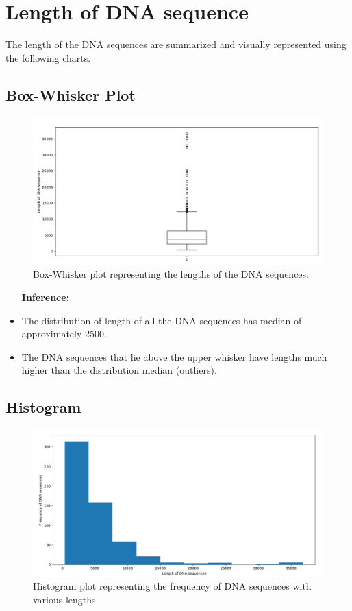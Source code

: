 \documentclass{article}
\begin{document}
	\section{Length of DNA sequence}
		The length of the DNA sequences are summarized and visually represented using the following charts.
			
			\vspace{51pt}
			\subsection{Box-Whisker Plot}
				\begin{figure}[!htbp]
					\centering
					\includegraphics[scale=0.48]{charts/Figure_13}
					\caption{Box-Whisker plot representing the lengths of the DNA sequences.}
				\end{figure}
				
				\begin{itemize}
					\item[\textbf{Inference:}]
					\item The distribution of length of all the DNA sequences has median of approximately 2500. 
					\item The DNA sequences that lie above the upper whisker have lengths much higher than the distribution median (outliers).
				\end{itemize}
			
			\subsection{Histogram}
				\begin{figure}[!htbp]
					\centering
					\includegraphics[scale=0.48]{charts/Figure_14}
					\caption{Histogram plot representing the frequency of DNA sequences with various lengths.}
				\end{figure}
			
\end{document}
